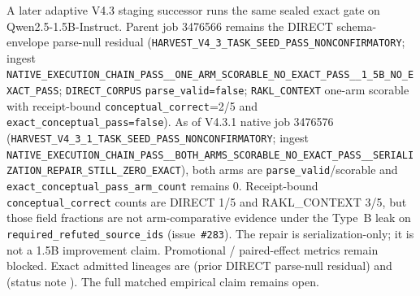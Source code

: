 \begin{sloppypar}
A later adaptive V4.3 staging successor runs the same sealed exact gate on
Qwen2.5-1.5B-Instruct.  Parent job 3476566 remains the DIRECT schema-envelope
parse-null residual
(\texttt{HARVEST\_V4\_3\_TASK\_SEED\_PASS\_NONCONFIRMATORY}; ingest
\texttt{NATIVE\_EXECUTION\_CHAIN\_PASS\_\_ONE\_ARM\_SCORABLE\_NO\_EXACT\_PASS\_\_1\_5B\_NO\_EXACT\_PASS};
\texttt{DIRECT\_CORPUS} \texttt{parse\_valid=false}; \texttt{RAKL\_CONTEXT}
one-arm scorable with receipt-bound \texttt{conceptual\_correct}=2/5 and
\texttt{exact\_conceptual\_pass=false}).  As of
V4.3.1 native job 3476576
(\texttt{HARVEST\_V4\_3\_1\_TASK\_SEED\_PASS\_NONCONFIRMATORY}; ingest
\texttt{NATIVE\_EXECUTION\_CHAIN\_PASS\_\_BOTH\_ARMS\_SCORABLE\_NO\_EXACT\_PASS\_\_SERIALIZATION\_REPAIR\_STILL\_ZERO\_EXACT}),
both arms are \texttt{parse\_valid}/scorable and
\texttt{exact\_conceptual\_pass\_arm\_count} remains 0.  Receipt-bound
\texttt{conceptual\_correct} counts are DIRECT 1/5 and RAKL\_CONTEXT 3/5, but
those field fractions are not arm-comparative evidence under the Type~B leak
on \texttt{required\_refuted\_source\_ids} (issue~\texttt{\#283}).  The repair is
serialization-only; it is not a 1.5B improvement claim.  Promotional /
paired-effect metrics remain blocked.  Exact admitted lineages are
(prior DIRECT parse-null residual) and
(status note
).
The full matched empirical claim remains open.
\end{sloppypar}

